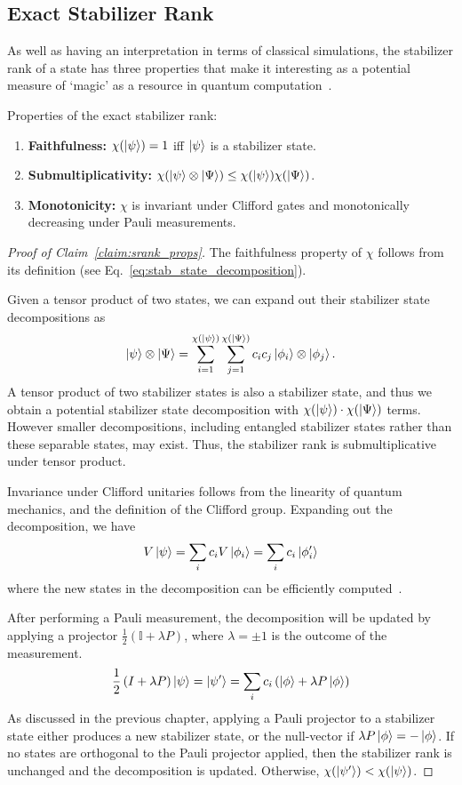 \subsection{Exact Stabilizer Rank}\label{sec:exact_results}
As well as having an interpretation in terms of classical simulations, the stabilizer rank of a state has three properties that make it interesting as a potential measure of `magic' as a resource in quantum computation~\cite{Howard2017,Seddon2019}. 
\begin{cla}
Properties of the exact stabilizer rank:\\
\begin{enumerate}
\item \textbf{Faithfulness:} $\chi(\ket{\psi})=1$ iff $\ket{\psi}$ is a stabilizer state.
\item \textbf{Submultiplicativity:} $\chi(\ket{\psi}\otimes\ket{\Psi})\leq \chi(\ket{\psi})\chi(\ket{\Psi})$.
\item \textbf{Monotonicity:} $\chi$ is invariant under Clifford gates and monotonically decreasing under Pauli measurements.
\end{enumerate}
\label{claim:srank_props}
\end{cla}
\begin{proof}[Proof of Claim~\ref{claim:srank_props}]
The faithfulness property of $\chi$ follows from its definition (see Eq.~\ref{eq:stab_state_decomposition}).\par
Given a tensor product of two states, we can expand out their stabilizer state decompositions as
\[\ket{\psi}\otimes\ket{\Psi}=\sum_{i=1}^{\chi(\ket{\psi})}\sum_{j=1}^{\chi(\ket{\Psi})}c_{i}c_{j}\ket{\phi_{i}}\otimes\ket{\phi_{j}}.\]
A tensor product of two stabilizer states is also a stabilizer state, and thus we obtain a potential stabilizer state decomposition with $\chi(\ket{\psi})\cdot\chi(\ket{\Psi})$ terms. However smaller decompositions, including entangled stabilizer states rather than these separable states, may exist. Thus, the stabilizer rank is submultiplicative under tensor product.\par
Invariance under Clifford unitaries follows from the linearity of quantum mechanics, and the definition of the Clifford group. Expanding out the decomposition, we have
\[V\ket{\psi}=\sum_{i}c_{i}V\ket{\phi_{i}} = \sum_{i}c_{i}\ket{\phi'_{i}}\]
where the new states in the decomposition can be efficiently computed~\cite{Gottesman1998b}.\par
After performing a Pauli measurement, the decomposition will be updated by applying a projector $\frac{1}{2}\left(\mathbb{I}+\lambda P\right)$, where $\lambda=\pm1$ is the outcome of the measurement.
\[\frac{1}{2}\left(I+\lambda P\right)\ket{\psi}=\ket{\psi'}=\sum_{i}c_{i}\left(\ket{\phi}+\lambda P\ket{\phi}\right)\]
As discussed in the previous chapter, applying a Pauli projector to a stabilizer state either produces a new stabilizer state, or the null-vector if $\lambda P\ket{\phi}=-\ket{\phi}$. If no states are orthogonal to the Pauli projector applied, then the stabilizer rank is unchanged and the decomposition is updated. Otherwise, $\chi(\ket{\psi'})<\chi(\ket{\psi})$.
\end{proof}
